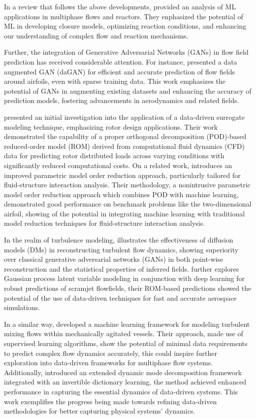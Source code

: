 In a review that follows the above developments, \citet{Zhu2022a} provided an analysis of ML applications in multiphase flows and reactors. They enphasized the potential of ML in developing closure models, optimizing reaction conditions, and enhancing our understanding of complex flow and reaction mechanisms.

Further, the integration of Generative Adversarial Networks (GANs) in flow field prediction has received considerable attention. For instance, \citet{WU2022a} presented a data augmented GAN (daGAN) for efficient and accurate prediction of flow fields around airfoils, even with sparse training data. This work emphasizes the potential of GANs in augmenting existing datasets and enhancing the accuracy of prediction models, fostering advancements in aerodynamics and related fields.

\citet{Peters2023} presented an initial investigation into the application of a data-driven surrogate modeling technique, emphasizing rotor design applications. Their work demonstrated the capability of a proper orthogonal decomposition (POD)-based reduced-order model (ROM) derived from computational fluid dynamics (CFD) data for predicting rotor distributed loads across varying conditions with significantly reduced computational costs. On a related work, \citet{Lee2024} introduces an improved parametric model order reduction approach, particularly tailored for fluid-structure interaction analysis. Their methodology, a nonintrusive parametric model order reduction approach which combines POD with machine learning, demonstrated good performance on benchmark problems like the two-dimensional airfoil, showing of the potential in integrating machine learning with traditional model reduction techniques for fluid-structure interaction analysis.

In the realm of turbulence modeling, \citet{Li2024} illustrates the effectiveness of diffusion models (DMs) in reconstructing turbulent flow dynamics, showing superiority over classical generative adversarial networks (GANs) in both point-wise reconstruction and the statistical properties of inferred fields. \citet{Fujio2023} further explores Gaussian process latent variable modeling in conjunction with deep learning for robust predictions of scramjet flowfields, their ROM-based predictions showed the potential of the use of data-driven techniques for fast and accurate aerospace simulations.

In a similar way, \citet{Li2023a} developed a machine learning framework for modeling turbulent mixing flows within mechanically agitated vessels. Their approach, made use of supervised learning algorithms, show the potential of minimal data requirements to predict complex flow dynamics accurately, this could inspire further exploration into data-driven frameworks for multiphase flow systems. Additionally, \cite{Jin2024} introduced an extended dynamic mode decomposition framework integrated with an invertible dictionary learning, the method achieved enhanced performance in capturing the essential dynamics of data-driven systems. This work exemplifies the progress being made towards refining data-driven methodologies for better capturing physical systems' dynamics.

